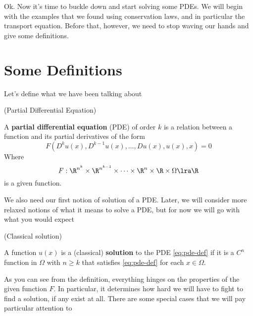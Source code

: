 \documentclass{bkcnotes}
\begin{document}
\maketitle

Ok. Now it's time to buckle down and start solving some PDEs. We will
begin with the examples that we found using conservation laws, and in
particular the transport equation. Before that, however, we need to
stop waving our hands and give some definitions.

\section{Some Definitions}

Let's define what we have been talking about

\begin{ndefn}(Partial Differential Equation)

  A \textbf{partial differential equation} (PDE) of order $k$ is a
  relation between a function and its partial derivatives of the form
  \begin{equation}
    \label{eq:pde-def}
    F(D^ku(x),D^{k-1}u(x),\ldots,Du(x),u(x),x) = 0
  \end{equation}
  Where
  \begin{equation}
    F : \R^{n^k} \times \R^{n^{k-1}} \times \cdots
    \times \R^n \times \R \times \Omega \lra \R
  \end{equation}
  is a given function.
\end{ndefn}

We also need our first notion of solution of a PDE. Later, we will
consider more relaxed notions of what it means to solve a PDE, but for
now we will go with what you would expect
\begin{ndefn}(Classical solution)

  A function $u(x)$ is a (classical) \textbf{solution} to the PDE
  \eqref{eq:pde-def} if it is a $C^n$ function in $\Omega$ with $n
  \geq k$ that satisfies \eqref{eq:pde-def} for each $x \in \Omega$.
\end{ndefn}

As you can see from the definition, everything hinges on the
properties of the given function $F$. In particular, it determines how
hard we will have to fight to find a solution, if any exist at
all. There are some special cases that we will pay particular
attention to
\end{document}

